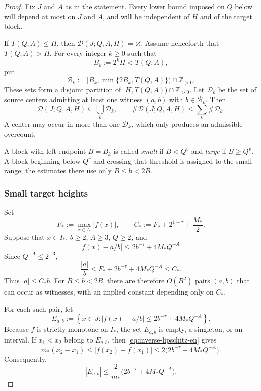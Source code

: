 \documentclass[11pt]{amsart}
\numberwithin{equation}{section}
\theoremstyle{definition}
\theoremstyle{remark}
\newcommand{\Z}{\mathbb Z}
\newcommand{\abs}[1]{\left\lvert #1\right\rvert}
\newcommand{\set}[1]{\left\{#1\right\}}
\begin{document}
\begin{proof}
Fix $J$ and $A$ as in the statement. Every lower bound imposed on $Q$
below will depend at most on $J$ and $A$, and will be independent of
$H$ and of the target block.

If $T(Q,A)\leq H$, then
$\mathcal D(J;Q,A,H)=\varnothing$. Assume henceforth that
$T(Q,A)>H$. For every integer $k\geq0$ such that
\[
B_k:=2^kH<T(Q,A),
\]
put
\begin{equation}\label{eq:dyadic-blocks-en}
\mathcal B_k
:=
[B_k,\min\{2B_k,T(Q,A)\})\cap\Z_{>0}.
\end{equation}
These sets form a disjoint partition of
$[H,T(Q,A))\cap\Z_{>0}$. Let $\mathcal D_k$ be the set of source centers
admitting at least one
witness $(a,b)$ with
$b\in\mathcal B_k$. Then
\begin{equation}\label{eq:D-covered-by-blocks-en}
\mathcal D(J;Q,A,H)\subseteq\bigcup_k\mathcal D_k,
\qquad
\#\mathcal D(J;Q,A,H)\leq\sum_k\#\mathcal D_k.
\end{equation}
A center may occur in more than one $\mathcal D_k$, which only produces
an admissible overcount.

A block with left endpoint $B=B_k$ is called \emph{small} if
$B<Q^v$ and \emph{large} if $B\geq Q^v$. A block beginning below
$Q^v$ and crossing that threshold is assigned to the small range; the
estimates there use only $B\leq b<2B$.

\subsubsection*{Small target heights}

Set
\begin{equation}\label{eq:F-star-C-star-en}
F_*:=\max_{x\in I_*}\abs{f(x)},
\qquad
C_*:=F_*+2^{1-\tau}+\frac{M_*}{2}.
\end{equation}
Suppose that $x\in I_*$, $b\geq2$, $A\geq3$, $Q\geq2$, and
\[
\abs{f(x)-a/b}\leq2b^{-\tau}+4M_*Q^{-A}.
\]
Since $Q^{-A}\leq2^{-3}$,
\[
\frac{|a|}{b}
\leq
F_*+2b^{-\tau}+4M_*Q^{-A}
\leq C_*.
\]
Thus $|a|\leq C_*b$. For $B\leq b<2B$, there are therefore
$O(B^2)$ pairs $(a,b)$ that can occur as witnesses, with an implied constant depending only on $C_*$.

For each such pair, let
\[
E_{a,b}
:=
\set{x\in J:
\abs{f(x)-a/b}\leq2b^{-\tau}+4M_*Q^{-A}}.
\]
Because $f$ is strictly monotone on $I_*$, the set $E_{a,b}$ is empty,
a singleton, or an interval. If $x_1<x_2$ belong to $E_{a,b}$, then
\eqref{eq:inverse-lipschitz-en} gives
\[
m_*(x_2-x_1)
\leq
\abs{f(x_2)-f(x_1)}
\leq
2\bigl(2b^{-\tau}+4M_*Q^{-A}\bigr).
\]
Consequently,
\begin{equation}\label{eq:Eab-length-en}
|E_{a,b}|
\leq
\frac{2}{m_*}\bigl(2b^{-\tau}+4M_*Q^{-A}\bigr).
\end{equation}


\end{proof}
\end{document}
